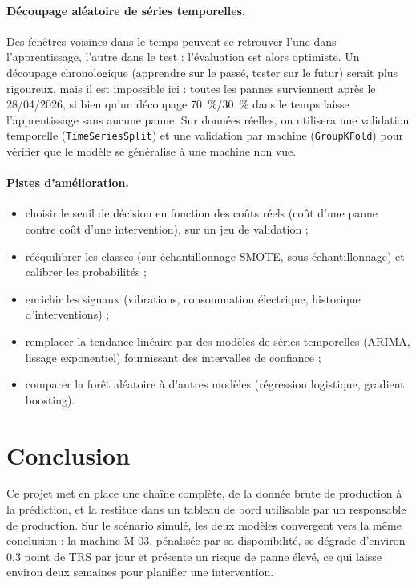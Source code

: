 \documentclass[11pt,a4paper]{article}
\newcommand{\code}[1]{\texttt{#1}}
\newcommand{\pct}[1]{#1~\%}
\begin{document}
\paragraph{Découpage aléatoire de séries temporelles.} Des fenêtres voisines dans le temps peuvent
se retrouver l'une dans l'apprentissage, l'autre dans le test : l'évaluation est alors optimiste.
Un découpage chronologique (apprendre sur le passé, tester sur le futur) serait plus rigoureux,
mais il est impossible ici : toutes les pannes surviennent après le 28/04/2026, si bien qu'un
découpage \pct{70}/\pct{30} dans le temps laisse l'apprentissage sans aucune panne. Sur données
réelles, on utilisera une validation temporelle (\code{TimeSeriesSplit}) et une validation par
machine (\code{GroupKFold}) pour vérifier que le modèle se généralise à une machine non vue.

\paragraph{Pistes d'amélioration.}
\begin{itemize}
  \item choisir le seuil de décision en fonction des coûts réels (coût d'une panne contre coût
        d'une intervention), sur un jeu de validation ;
  \item rééquilibrer les classes (sur-échantillonnage SMOTE, sous-échantillonnage) et calibrer les
        probabilités ;
  \item enrichir les signaux (vibrations, consommation électrique, historique d'interventions) ;
  \item remplacer la tendance linéaire par des modèles de séries temporelles (ARIMA, lissage
        exponentiel) fournissant des intervalles de confiance ;
  \item comparer la forêt aléatoire à d'autres modèles (régression logistique, gradient boosting).
\end{itemize}

\section{Conclusion}
Ce projet met en place une chaîne complète, de la donnée brute de production à la prédiction, et la
restitue dans un tableau de bord utilisable par un responsable de production. Sur le scénario
simulé, les deux modèles convergent vers la même conclusion : la machine M-03, pénalisée par sa
disponibilité, se dégrade d'environ 0,3 point de TRS par jour et présente un risque de panne élevé,
ce qui laisse environ deux semaines pour planifier une intervention.
\end{document}
